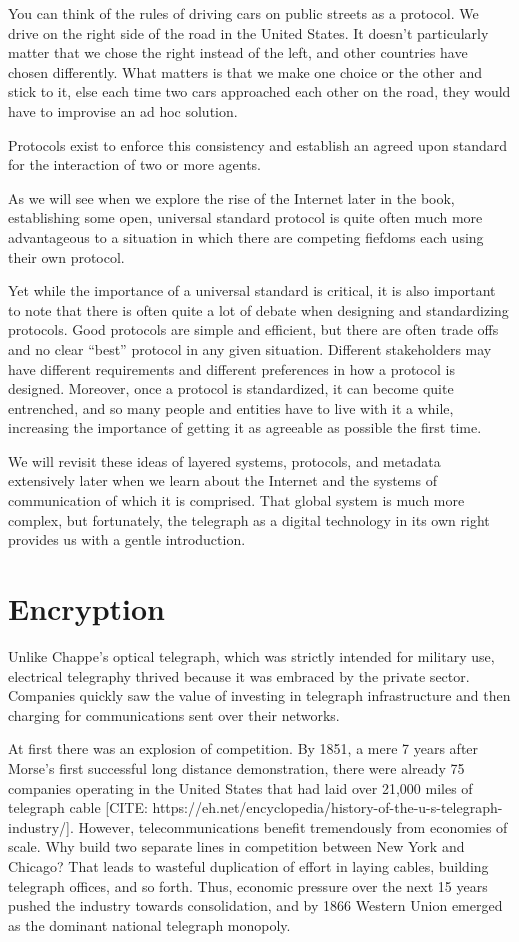 \documentclass[UTF8]{book}
\begin{document}
\begin{CJK}{UTF8}{gbsn}
You can think of the rules of driving cars on public streets as a protocol. We drive on the right side of the road in the United States. It doesn't particularly matter that we chose the right instead of the left, and other countries have chosen differently. What matters is that we make one choice or the other and stick to it, else each time two cars approached each other on the road, they would have to improvise an ad hoc solution.

Protocols exist to enforce this consistency and establish an agreed upon standard for the interaction of two or more agents.

As we will see when we explore the rise of the Internet later in the book, establishing some open, universal standard protocol is quite often much more advantageous to a situation in which there are competing fiefdoms each using their own protocol.

Yet while the importance of a universal standard is critical, it is also important to note that there is often quite a lot of debate when designing and standardizing protocols. Good protocols are simple and efficient, but there are often trade offs and no clear ``best'' protocol in any given situation. Different stakeholders may have different requirements and different preferences in how a protocol is designed. Moreover, once a protocol is standardized, it can become quite entrenched, and so many people and entities have to live with it a while, increasing the importance of getting it as agreeable as possible the first time.

We will revisit these ideas of layered systems, protocols, and metadata extensively later when we learn about the Internet and the systems of communication of which it is comprised. That global system is much more complex, but fortunately, the telegraph as a digital technology in its own right provides us with a gentle introduction.

\section{Encryption}

Unlike Chappe's optical telegraph, which was strictly intended for military use, electrical telegraphy thrived because it was embraced by the private sector. Companies quickly saw the value of investing in telegraph infrastructure and then charging for communications sent over their networks.

At first there was an explosion of competition. By 1851, a mere 7 years after Morse's first successful long distance demonstration, there were already 75 companies operating in the United States that had laid over 21,000 miles of telegraph cable [CITE: https://eh.net/encyclopedia/history-of-the-u-s-telegraph-industry/]. However, telecommunications benefit tremendously from economies of scale. Why build two separate lines in competition between New York and Chicago? That leads to wasteful duplication of effort in laying cables, building telegraph offices, and so forth. Thus, economic pressure over the next 15 years pushed the industry towards consolidation, and by 1866 Western Union emerged as the dominant national telegraph monopoly.


\end{CJK}
\end{document}
